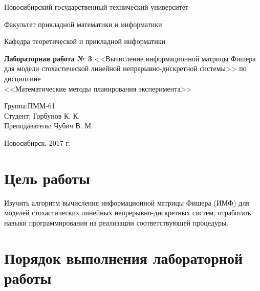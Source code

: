 \documentclass[a4paper,14pt]{extarticle}
\begin{document}
\setcounter{secnumdepth}{0}

\begin{titlepage}

  \begin{center}
    Новосибирский государственный технический университет
    
    Факультет прикладной математики и информатики
    
    Кафедра теоретической и прикладной информатики
    
    \vspace{250pt}
    
    \textbf{\Large{Лабораторная работа № 3}}
    \medbreak
		<<Вычисление информационной матрицы Фишера для модели стохастической
		линейной непрерывно-дискретной системы>>
		\medbreak 
		по дисциплине \\
    \medbreak
    <<Математические методы планирования эксперимента>>
    \vspace{100pt}
  \end{center}

  \begin{flushleft}
    \begin{tabbing}
      Группа:\qquad\qquad \= ПММ-61\\
      Студент:            \> Горбунов К. К.\\
      Преподаватель:      \> Чубич В. М.\\
    \end{tabbing}
  \end{flushleft}

  \begin{center}
    \vspace{\fill}
    Новосибирск, 2017 г.
  \end{center}

\end{titlepage}

\newpage

\section{Цель работы}

Изучить алгоритм вычисления информационной матрицы Фишера (ИМФ) для моделей
стохастических линейных непрерывно-дискретных систем, отработать навыки
программирования на реализации соответствующей процедуры.

\section{Порядок выполнения лабораторной работы}
\end{document}
